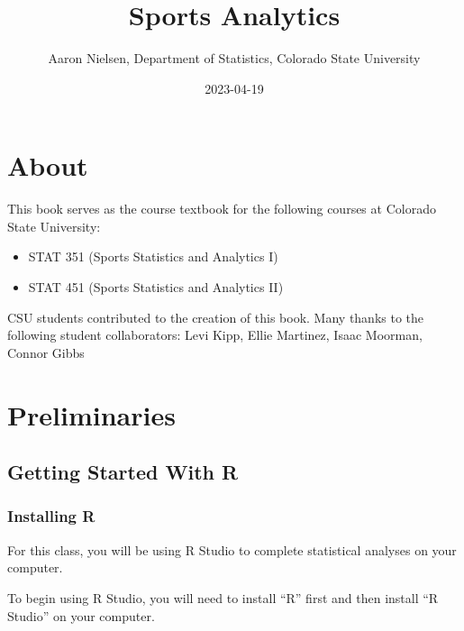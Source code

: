 \documentclass[
  11pt,
]{book}
\title{Sports Analytics}
\author{Aaron Nielsen, Department of Statistics, Colorado State University}
\date{2023-04-19}
\theoremstyle{definition}
\theoremstyle{definition}
\theoremstyle{definition}
\theoremstyle{definition}
\theoremstyle{remark}
\begin{document}
\maketitle

{
\setcounter{tocdepth}{1}
\tableofcontents
}
\hypertarget{about}{%
\chapter*{About}\label{about}}

This book serves as the course textbook for the following courses at Colorado State University:

\begin{itemize}
\item
  STAT 351 (Sports Statistics and Analytics I)
\item
  STAT 451 (Sports Statistics and Analytics II)
\end{itemize}

\hfill\break

CSU students contributed to the creation of this book. Many thanks to the following student collaborators: Levi Kipp, Ellie Martinez, Isaac Moorman, Connor Gibbs

\hypertarget{preliminaries}{%
\chapter*{Preliminaries}\label{preliminaries}}

\hypertarget{getting-started-with-r}{%
\section*{Getting Started With R}\label{getting-started-with-r}}

\hypertarget{installing-r}{%
\subsection*{Installing R}\label{installing-r}}

For this class, you will be using R Studio to complete statistical analyses on your computer.

To begin using R Studio, you will need to install ``R'' first and then install ``R Studio'' on your computer.
\end{document}

